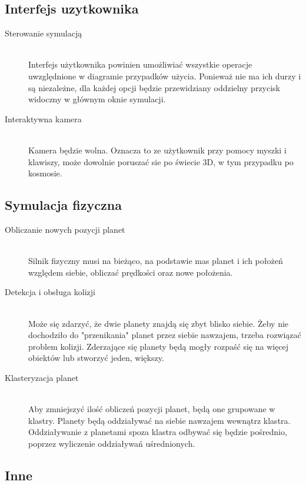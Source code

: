 \subsection{Interfejs uzytkownika}

\begin{description}
	\item[Sterowanie symulacją] \hfill \\
	Interfejs użytkownika powinien umożliwiać wszystkie operacje uwzględnione w diagramie przypadków użycia. Ponieważ nie ma ich durzy i są niezależne, dla każdej opcji będzie przewidziany oddzielny przycisk widoczny w głównym oknie symulacji.
	\item[Interaktywna kamera] \hfill \\
	Kamera będzie wolna. Oznacza to ze użytkownik przy pomocy myszki i klawiszy, może dowolnie poruszać sie po świecie 3D, w tym przypadku po kosmosie.
\end{description}

\subsection{Symulacja fizyczna}

\begin{description}
	\item[Obliczanie nowych pozycji planet] \hfill \\
	Silnik fizyczny musi na bieżąco, na podstawie mas planet i ich położeń względem siebie, obliczać prędkości oraz nowe położenia. 
	\item[Detekcja i obsługa kolizji] \hfill \\
	Może się zdarzyć, że dwie planety znajdą się zbyt blisko siebie. Żeby nie dochodziło do "przenikania" planet przez siebie nawzajem, trzeba rozwiązać problem kolizji. Zderzające się planety będą mogły rozpaść się na więcej obiektów lub stworzyć jeden, większy.
	\item[Klasteryzacja planet] \hfill \\
	Aby zmniejszyć ilość obliczeń pozycji planet, będą one grupowane w klastry. Planety będą oddziaływać na siebie nawzajem wewnątrz klastra. Oddziaływanie z planetami spoza klastra odbywać się będzie pośrednio, poprzez wyliczenie oddziaływań uśrednionych.

\end{description}

\subsection{Inne}

